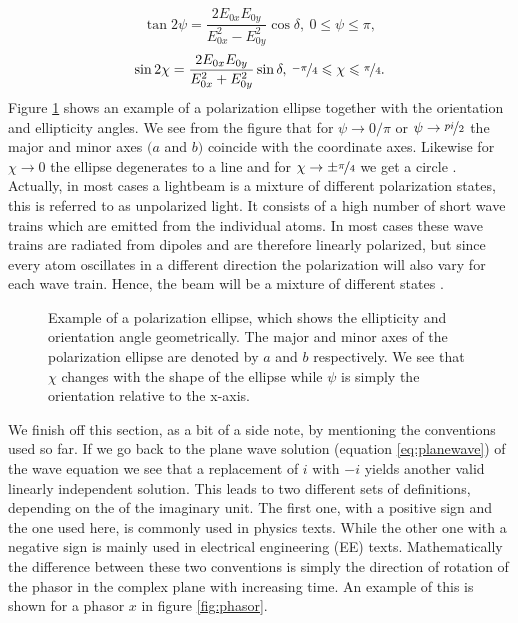\begin{equation}
    \label{eq:ellipse_orientation}
    \tan 2\psi = \frac{2E_{0x}E_{0y}}{E_{0x}^2 - E_{0y}^2}\cos \delta,\: 0\leqslant\psi\leqslant\pi,
\end{equation}
\begin{equation}
    \label{eq:ellipse_ellipticity}
    \sin 2\chi = \frac{2E_{0x}E_{0y}}{E_{0x}^2 + E_{0y}^2}\sin \delta,\: \nicefrac{-\pi}{4}\leqslant\chi\leqslant\nicefrac{\pi}{4}.
\end{equation}
Figure \ref{fig:pol_ellipse} shows an example of a polarization ellipse together with the orientation and ellipticity angles. We see from the figure that for $\psi \rightarrow 0/\pi$ or $\psi \rightarrow \nicefrac{pi}{2}$ the major and minor axes $(a$ and $b)$ coincide with the coordinate axes. Likewise for $\chi \rightarrow 0$ the ellipse degenerates to a line and for $\chi \rightarrow \pm\nicefrac{\pi}{4}$ we get a circle \cite{Collett2009FieldPolarization}. Actually, in most cases a lightbeam is a mixture of different polarization states, this is referred to as unpolarized light. It consists of a high number of short wave trains which are emitted from the individual atoms. In most cases these wave trains are radiated from dipoles and are therefore linearly polarized, but since every atom oscillates in a different direction the polarization will also vary for each wave train. Hence, the beam will be a mixture of different states \cite{Roth2019Optik}. 

\begin{figure}[h]
    \centering
    
    \caption{Example of a polarization ellipse, which shows the ellipticity and orientation angle geometrically. The major and minor axes of the polarization ellipse are denoted by $a$ and $b$ respectively. We see that $\chi$ changes with the shape of the ellipse while $\psi$ is simply the orientation relative to the x-axis.}
    \label{fig:pol_ellipse}
\end{figure}

We finish off this section, as a bit of a side note, by mentioning the conventions used so far. If we go back to the plane wave solution (equation \ref{eq:planewave}) of the wave equation we see that a replacement of $i$ with $-i$ yields another valid linearly independent solution. This leads to two different sets of definitions, depending on the of the imaginary unit. The first one, with a positive sign and the one used here, is commonly used in physics texts. While the other one with a negative sign is mainly used in electrical engineering (EE) texts. Mathematically the difference between these two conventions is simply the direction of rotation of the phasor in the complex plane with increasing time. An example of this is shown for a phasor $x$ in figure \ref{fig:phasor}. 

